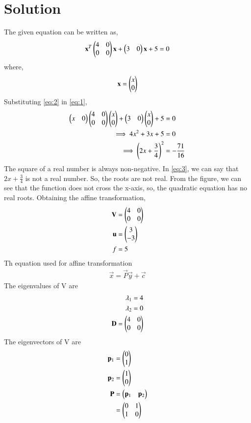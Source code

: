 \documentclass[journal,12pt,twocolumn]{IEEEtran}
\begin{document}
\section*{Solution}
The given equation can be written as,
\begin{align}
    \mathbf{x}^T\begin{pmatrix}4 & 0 \\ 0 & 0\end{pmatrix}\mathbf{x} + \begin{pmatrix}3 & 0\end{pmatrix}\mathbf{x} + 5 = 0 \label{eq:1}
\end{align}
where,
\begin{align}
    \mathbf{x} = \begin{pmatrix}x \\ 0\end{pmatrix} \label{eq:2}
\end{align}
Substituting \eqref{eq:2} in \eqref{eq:1},
\begin{align}
    \begin{pmatrix}x & 0\end{pmatrix}\begin{pmatrix}4 & 0 \\ 0 & 0\end{pmatrix}\begin{pmatrix}x \\ 0\end{pmatrix} + \begin{pmatrix}3 & 0\end{pmatrix}\begin{pmatrix}x \\ 0\end{pmatrix} + 5 &= 0 \\
    \implies 4x^2 + 3x + 5 &= 0\\
    \implies \left(2x + \frac{3}{4}\right)^2 &= -\frac{71}{16}\label{eq:3}
\end{align}
The square of a real number is always non-negative. In \eqref{eq:3}, we can say that $2x + \frac{3}{4}$ is not a real number. So, the roots are not real. From the figure, we can see that the function does not cross the x-axis, so, the quadratic equation has no real roots. Obtaining the affine transformation,
\begin{align}
    \mathbf{V} &= \begin{pmatrix}4 & 0 \\ 0 & 0\end{pmatrix}\\
    \mathbf{u} &= \begin{pmatrix}3\\-3\end{pmatrix}\\
    f &= 5
\end{align}
Th equation used for affine transformation
\begin{align}
    \vec{x} = \vec{P}\vec{y} + \vec{c}
\end{align}
The eigenvalues of V are
\begin{align}
    \lambda_1 = 4\\
    \lambda_2 = 0\\
    \mathbf{D} = \begin{pmatrix}4 & 0\\0 & 0\end{pmatrix}
\end{align}
The eigenvectors of V are
\begin{align}
    \mathbf{p}_1 &= \begin{pmatrix}0 \\ 1\end{pmatrix}\\
    \mathbf{p}_2 &= \begin{pmatrix}1 \\ 0\end{pmatrix}\\
    \mathbf{P} &= \begin{pmatrix}\mathbf{p}_1 & \mathbf{p}_2\end{pmatrix}\\
    &= \begin{pmatrix}0 & 1 \\ 1 & 0\end{pmatrix}
\end{align}
\end{document}
